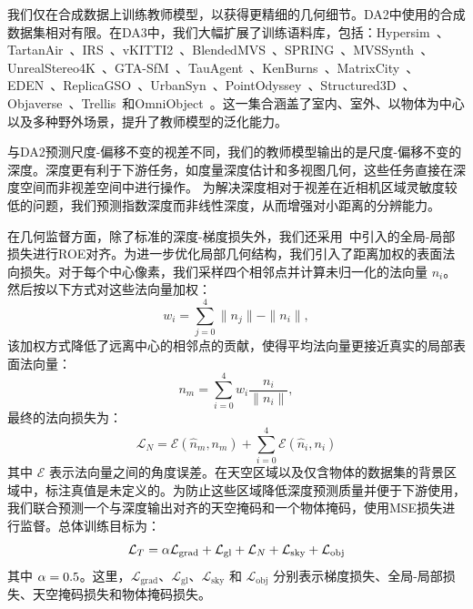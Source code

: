  我们仅在合成数据上训练教师模型，以获得更精细的几何细节。DA2中使用的合成数据集相对有限。在DA3中，我们大幅扩展了训练语料库，包括：Hypersim~\citep{roberts2021hypersim}、TartanAir~\citep{tartanair2020iros}、IRS~\citep{wang2019irs}、vKITTI2~\citep{cabon2020vkitti2}、BlendedMVS~\citep{yao2020blendedmvs}、SPRING~\citep{mehl2023spring}、MVSSynth~\citep{DeepMVS}、UnrealStereo4K~\citep{zhang2018unrealstereo}、GTA-SfM~\citep{wang2020flow}、TauAgent~\citep{gil2021online}、KenBurns~\cite{niklaus20193d}、MatrixCity~\citep{li2023matrixcity}、EDEN~\citep{le2021eden}、ReplicaGSO~\citep{replica19arxiv}、UrbanSyn~\citep{GOMEZ2025130038}、PointOdyssey~\citep{zheng2023pointodyssey}、Structured3D~\citep{zheng2020structured3d}、Objaverse~\citep{deitke2023objaverse}、Trellis~\citep{xiang2024structured}和OmniObject~\citep{wu2023omniobject3d}。这一集合涵盖了室内、室外、以物体为中心以及多种野外场景，提升了教师模型的泛化能力。

 与DA2预测尺度-偏移不变的视差不同，我们的教师模型输出的是尺度-偏移不变的深度。深度更有利于下游任务，如度量深度估计和多视图几何，这些任务直接在深度空间而非视差空间中进行操作。
为解决深度相对于视差在近相机区域灵敏度较低的问题，我们预测指数深度而非线性深度，从而增强对小距离的分辨能力。

在几何监督方面，除了标准的深度-梯度损失外，我们还采用~\cite{wang2025moge}中引入的全局-局部损失进行ROE对齐。为进一步优化局部几何结构，我们引入了距离加权的表面法向损失。对于每个中心像素，我们采样四个相邻点并计算未归一化的法向量 $n_i$。然后按以下方式对这些法向量加权：
\begin{equation}
  w_i= \sum _ {j=0}^ 4 \parallel n_j\parallel - \parallel n_i \parallel,
  \label{eq:normal_weight}
\end{equation}
该加权方式降低了远离中心的相邻点的贡献，使得平均法向量更接近真实的局部表面法向量：
\begin{equation}
 n_m= \sum _ {i=0}^ {4} w_i \frac {n_i}{\parallel n_i \parallel},
 \label{eq:normal_mean}
\end{equation}
最终的法向损失为：
\begin{equation}
 \mathcal{L}_{N} = \mathcal{E}(\hat{n}_{m}, n_m) + \sum _ {i=0}^{4} \mathcal{E}(\hat{n}_i, n_i)
 \label{eq:normal_loss}
\end{equation}
其中 $\mathcal{E}$ 表示法向量之间的角度误差。在天空区域以及仅含物体的数据集的背景区域中，标注真值是未定义的。为防止这些区域降低深度预测质量并便于下游使用，我们联合预测一个与深度输出对齐的天空掩码和一个物体掩码，使用MSE损失进行监督。总体训练目标为：
\begin{equation}
 \mathcal{L}_{T} = \alpha \mathcal{L}_\text{grad} + \mathcal{L}_\text{gl} + \mathcal{L}_{N} + \mathcal{L}_\text{sky} + \mathcal{L}_\text{obj}
 \label{eq:teacher_loss}
\end{equation}
其中 $\alpha = 0.5$。这里，$\mathcal{L}_\text{grad}$、$\mathcal{L}_\text{gl}$、$\mathcal{L}_\text{sky}$ 和 $\mathcal{L}_\text{obj}$ 分别表示梯度损失、全局-局部损失、天空掩码损失和物体掩码损失。


